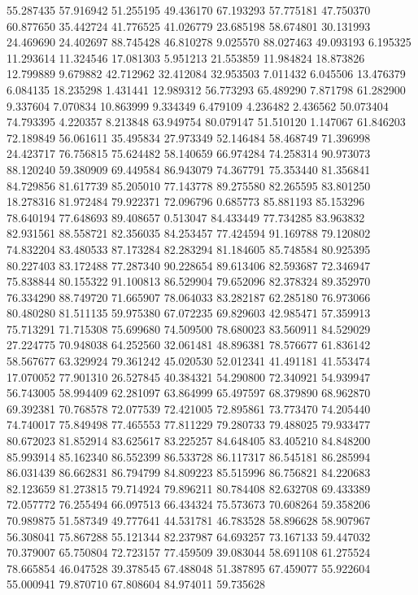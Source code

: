 55.287435
57.916942
51.255195
49.436170
67.193293
57.775181
47.750370
60.877650
35.442724
41.776525
41.026779
23.685198
58.674801
30.131993
24.469690
24.402697
88.745428
46.810278
9.025570
88.027463
49.093193
6.195325
11.293614
11.324546
17.081303
5.951213
21.553859
11.984824
18.873826
12.799889
9.679882
42.712962
32.412084
32.953503
7.011432
6.045506
13.476379
6.084135
18.235298
1.431441
12.989312
56.773293
65.489290
7.871798
61.282900
9.337604
7.070834
10.863999
9.334349
6.479109
4.236482
2.436562
50.073404
74.793395
4.220357
8.213848
63.949754
80.079147
51.510120
1.147067
61.846203
72.189849
56.061611
35.495834
27.973349
52.146484
58.468749
71.396998
24.423717
76.756815
75.624482
58.140659
66.974284
74.258314
90.973073
88.120240
59.380909
69.449584
86.943079
74.367791
75.353440
81.356841
84.729856
81.617739
85.205010
77.143778
89.275580
82.265595
83.801250
18.278316
81.972484
79.922371
72.096796
0.685773
85.881193
85.153296
78.640194
77.648693
89.408657
0.513047
84.433449
77.734285
83.963832
82.931561
88.558721
82.356035
84.253457
77.424594
91.169788
79.120802
74.832204
83.480533
87.173284
82.283294
81.184605
85.748584
80.925395
80.227403
83.172488
77.287340
90.228654
89.613406
82.593687
72.346947
75.838844
80.155322
91.100813
86.529904
79.652096
82.378324
89.352970
76.334290
88.749720
71.665907
78.064033
83.282187
62.285180
76.973066
80.480280
81.511135
59.975380
67.072235
69.829603
42.985471
57.359913
75.713291
71.715308
75.699680
74.509500
78.680023
83.560911
84.529029
27.224775
70.948038
64.252560
32.061481
48.896381
78.576677
61.836142
58.567677
63.329924
79.361242
45.020530
52.012341
41.491181
41.553474
17.070052
77.901310
26.527845
40.384321
54.290800
72.340921
54.939947
56.743005
58.994409
62.281097
63.864999
65.497597
68.379890
68.962870
69.392381
70.768578
72.077539
72.421005
72.895861
73.773470
74.205440
74.740017
75.849498
77.465553
77.811229
79.280733
79.488025
79.933477
80.672023
81.852914
83.625617
83.225257
84.648405
83.405210
84.848200
85.993914
85.162340
86.552399
86.533728
86.117317
86.545181
86.285994
86.031439
86.662831
86.794799
84.809223
85.515996
86.756821
84.220683
82.123659
81.273815
79.714924
79.896211
80.784408
82.632708
69.433389
72.057772
76.255494
66.097513
66.434324
75.573673
70.608264
59.358206
70.989875
51.587349
49.777641
44.531781
46.783528
58.896628
58.907967
56.308041
75.867288
55.121344
82.237987
64.693257
73.167133
59.447032
70.379007
65.750804
72.723157
77.459509
39.083044
58.691108
61.275524
78.665854
46.047528
39.378545
67.488048
51.387895
67.459077
55.922604
55.000941
79.870710
67.808604
84.974011
59.735628
